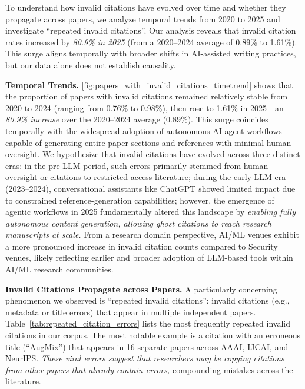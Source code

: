 To understand how invalid citations have evolved over time and whether they propagate across papers, we analyze temporal trends from 2020 to 2025 and investigate ``repeated invalid citations''.
Our analysis reveals that invalid citation rates increased by \textit{80.9\% in 2025} (from a 2020--2024 average of 0.89\% to 1.61\%). This surge aligns temporally with broader shifts in AI-assisted writing practices, but our data alone does not establish causality.

\noindent\textbf{Temporal Trends.}
\cref{fig:papers_with_invalid_citations_timetrend} shows that the proportion of papers with invalid citations remained relatively stable from 2020 to 2024 (ranging from 0.76\% to 0.98\%), then rose to 1.61\% in 2025---an \textit{80.9\% increase} over the 2020--2024 average (0.89\%). 
This surge coincides temporally with the widespread adoption of autonomous AI agent workflows capable of generating entire paper sections and references with minimal human oversight.
We hypothesize that invalid citations have evolved across three distinct eras: in the pre-LLM period, such errors primarily stemmed from human oversight or citations to restricted-access literature; during the early LLM era (2023--2024), conversational assistants like ChatGPT showed limited impact due to constrained reference-generation capabilities; however, the emergence of agentic workflows in 2025 fundamentally altered this landscape by \textit{enabling fully autonomous content generation, allowing ghost citations to reach research manuscripts at scale.}
From a research domain perspective, AI/ML venues exhibit a more pronounced increase in invalid citation counts compared to Security venues, likely reflecting earlier and broader adoption of LLM-based tools within AI/ML research communities.



\noindent
\textbf{Invalid Citations Propagate across Papers.}
A particularly concerning phenomenon we observed is ``repeated invalid citations'': invalid citations (e.g., metadata or title errors) that appear in multiple independent papers.
Table~\ref{tab:repeated_citation_errors} lists the most frequently repeated invalid citations in our corpus.
The most notable example is a citation with an erroneous title (``AugMix'') that appears in 16 separate papers across AAAI, IJCAI, and NeurIPS.
\textit{These viral errors suggest that researchers may be copying citations from other papers that already contain errors,} compounding mistakes across the literature.

